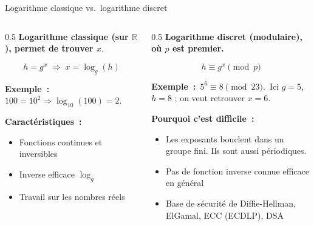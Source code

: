 \documentclass{beamer}
\begin{document}
    \begin{frame}{Logarithme classique vs.\ logarithme discret}
        \footnotesize
        \begin{columns}[T,totalwidth=\textwidth]
            \begin{column}{0.5\textwidth}
                \textbf{Logarithme classique (sur $\mathbb{R}$), permet de trouver $x$}.

                \[
                    h = g^{x} \;\Longrightarrow\; x = \log_{g}(h)
                \]

                \bigbreak
                \textbf{Exemple~:}\,
                $100 = 10^{2} \Rightarrow \log_{10}(100)=2$.

                \bigbreak
                \textbf{Caractéristiques~:}
                \begin{itemize}
                    \item Fonctions continues et inversibles
                    \item Inverse efficace $\log_g$
                    \item Travail sur les nombres réels
                \end{itemize}
            \end{column}

            \begin{column}{0.5\textwidth}
                \textbf{Logarithme discret (modulaire), où $p$ est premier.}

                \[
                    h \equiv g^{x} \pmod{p}
                \]

                \bigbreak
                \textbf{Exemple~:}\,
                $5^{6} \equiv 8 \pmod{23}$.\,
                Ici $g=5$, $h=8$ ; on veut retrouver $x=6$.

                \bigbreak
                \textbf{Pourquoi c'est difficile~:}
                \begin{itemize}
                    \item Les exposants bouclent dans un groupe fini.
                    Ils sont aussi périodiques.
                    \item Pas de fonction inverse connue efficace en général
                    \item Base de sécurité de Diffie-Hellman, ElGamal, ECC (ECDLP), DSA
                \end{itemize}
            \end{column}
        \end{columns}
    \end{frame}
\end{document}
